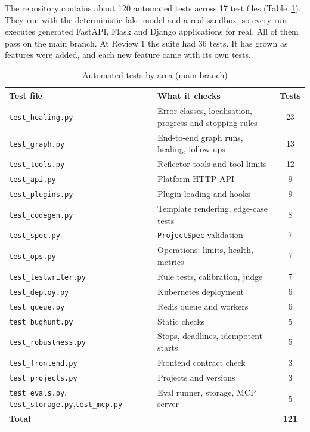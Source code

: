 \documentclass[12pt,a4paper]{report}
\begin{document}
The repository contains about 120 automated tests across 17 test files (Table~\ref{tab:tests}). They run with the deterministic fake model and a real sandbox, so every run executes generated FastAPI, Flask and Django applications for real. All of them pass on the main branch. At Review 1 the suite had 36 tests. It has grown as features were added, and each new feature came with its own tests.

\begin{table}[!ht]
    \centering
    \renewcommand{\arraystretch}{1.2}
    \caption{Automated tests by area (main branch)}
    \label{tab:tests}
    \begin{tabular}{|p{4.6cm}|p{7.2cm}|c|}
    \hline
    \textbf{Test file} & \textbf{What it checks} & \textbf{Tests} \\\hline
    \texttt{test\_healing.py} & Error classes, localisation, progress and stopping rules & 23 \\\hline
    \texttt{test\_graph.py} & End-to-end graph runs, healing, follow-ups & 13 \\\hline
    \texttt{test\_tools.py} & Reflector tools and tool limits & 12 \\\hline
    \texttt{test\_api.py} & Platform HTTP API & 9 \\\hline
    \texttt{test\_plugins.py} & Plugin loading and hooks & 9 \\\hline
    \texttt{test\_codegen.py} & Template rendering, edge-case tests & 8 \\\hline
    \texttt{test\_spec.py} & \texttt{ProjectSpec} validation & 7 \\\hline
    \texttt{test\_ops.py} & Operations: limits, health, metrics & 7 \\\hline
    \texttt{test\_testwriter.py} & Rule tests, calibration, judge & 7 \\\hline
    \texttt{test\_deploy.py} & Kubernetes deployment & 6 \\\hline
    \texttt{test\_queue.py} & Redis queue and workers & 6 \\\hline
    \texttt{test\_bughunt.py} & Static checks & 5 \\\hline
    \texttt{test\_robustness.py} & Stops, deadlines, idempotent starts & 5 \\\hline
    \texttt{test\_frontend.py} & Frontend contract check & 3 \\\hline
    \texttt{test\_projects.py} & Projects and versions & 3 \\\hline
    \texttt{test\_evals.py}, \texttt{test\_storage.py},\newline \texttt{test\_mcp.py} & Eval runner, storage, MCP server & 5 \\\hline
    \textbf{Total} & & \textbf{121} \\\hline
    \end{tabular}
\end{table}
\end{document}
